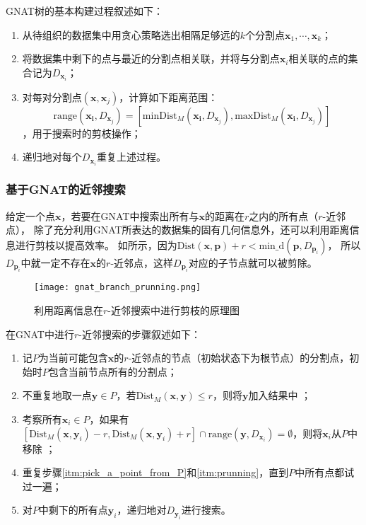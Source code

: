 GNAT树的基本构建过程叙述如下：
\begin{enumerate}
  \renewcommand{\labelenumi}{(\theenumi)}
  \item 从待组织的数据集中用贪心策略选出相隔足够远的$k$个分割点$\bm{x}_1,\cdots,\bm{x}_k$；
  \item 将数据集中剩下的点与最近的分割点相关联，并将与分割点$\bm{x}_i$相关联的点的集合记为$D_{\bm{x}_i}$；
  \item 对每对分割点$(\bm{x},\bm{x}_j)$，计算如下距离范围：
  \begin{equation}
    \text{range}(\bm{x_i}, D_{\bm{x}_j}) = [\text{minDist}_M(\bm{x_i}, D_{\bm{x}_j}), \text{maxDist}_M(\bm{x_i}, D_{\bm{x}_j})]
  \end{equation}，用于搜索时的剪枝操作；
  \item 递归地对每个$D_{\bm{x}_i}$重复上述过程。
\end{enumerate}

\subsubsection{基于GNAT的近邻搜索}\label{subsubsec:near_search_based_on_gnat}
给定一个点$\bm{x}$，若要在GNAT中搜索出所有与$\bm{x}$的距离在$r$之内的所有点（$r$-近邻点），
除了充分利用GNAT所表达的数据集的固有几何信息外，还可以利用距离信息进行剪枝以提高效率。
如所示，因为$\text{Dist}(\bm{x}, \bm{p}) + r < \text{min\_d}(\bm{p}, D_{\bm{p}_i})$，
所以$D_{\bm{p}_i}$中就一定不存在$\bm{x}$的$r$-近邻点，这样$D_{\bm{p}_i}$对应的子节点就可以被剪除。
\begin{figure}[ht]
  \centering
  \texttt{[image: gnat\_branch\_prunning.png]}
  \caption{利用距离信息在$r$-近邻搜索中进行剪枝的原理图}
  \label{fig:gnat_branch_prunning}
\end{figure}

在GNAT中进行$r$-近邻搜索的步骤叙述如下：
\begin{enumerate}
  \renewcommand{\labelenumi}{(\theenumi)}
  \item 记$P$为当前可能包含$\bm{x}$的$r$-近邻点的节点（初始状态下为根节点）的分割点，初始时$P$包含当前节点所有的分割点；
  \item 不重复地取一点$\bm{y} \in P$，若$\text{Dist}_M(\bm{x}, \bm{y}) \leq r$，则将$\bm{y}$加入结果中 \label{itm:pick_a_point_from_P}；
  \item 考察所有$\bm{x}_i \in P$，如果有$[\text{Dist}_M(\bm{x}, \bm{y}_i)-r, \text{Dist}_M(\bm{x}, \bm{y}_i)+r] \cap \text{range}(\bm{y}, D_{\bm{x}_i}) = \emptyset$，则将$\bm{x}_i$从$P$中移除 \label{itm:prunning}；
  \item 重复步骤\ref{itm:pick_a_point_from_P}和\ref{itm:prunning}，直到$P$中所有点都试过一遍；
  \item 对$P$中剩下的所有点$\bm{y}_i$，递归地对$D_{\bm{y}_i}$进行搜索。
\end{enumerate}

